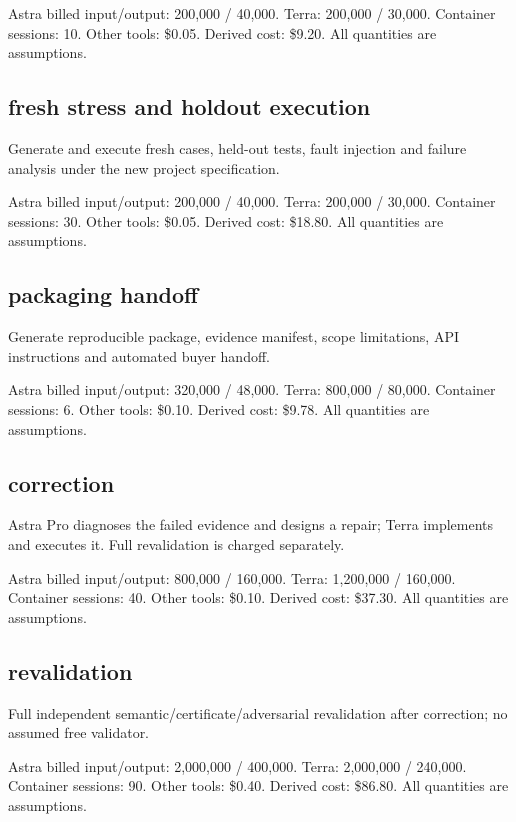 \documentclass[10pt]{article}
\newcommand{\usd}[1]{\$#1}
\begin{document}
Astra billed input/output: 200,000 / 40,000. Terra: 200,000 / 30,000. Container sessions: 10. Other tools: \usd{0.05}. Derived cost: \usd{9.20}. All quantities are assumptions.

\subsection*{fresh stress and holdout execution}

Generate and execute fresh cases, held-out tests, fault injection and failure analysis under the new project specification.

Astra billed input/output: 200,000 / 40,000. Terra: 200,000 / 30,000. Container sessions: 30. Other tools: \usd{0.05}. Derived cost: \usd{18.80}. All quantities are assumptions.

\subsection*{packaging handoff}

Generate reproducible package, evidence manifest, scope limitations, API instructions and automated buyer handoff.

Astra billed input/output: 320,000 / 48,000. Terra: 800,000 / 80,000. Container sessions: 6. Other tools: \usd{0.10}. Derived cost: \usd{9.78}. All quantities are assumptions.

\subsection*{correction}

Astra Pro diagnoses the failed evidence and designs a repair; Terra implements and executes it. Full revalidation is charged separately.

Astra billed input/output: 800,000 / 160,000. Terra: 1,200,000 / 160,000. Container sessions: 40. Other tools: \usd{0.10}. Derived cost: \usd{37.30}. All quantities are assumptions.

\subsection*{revalidation}

Full independent semantic/certificate/adversarial revalidation after correction; no assumed free validator.

Astra billed input/output: 2,000,000 / 400,000. Terra: 2,000,000 / 240,000. Container sessions: 90. Other tools: \usd{0.40}. Derived cost: \usd{86.80}. All quantities are assumptions.
\end{document}
